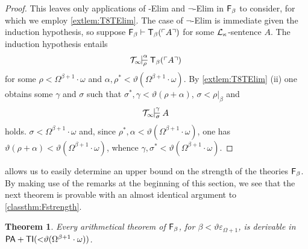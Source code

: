 \documentclass[UKenglish,cleveref,DIV=12]{scrartcl}
\newtheorem{theorem}{Theorem}
\theoremstyle{definition}
\theoremstyle{definition}
\begin{document}
\begin{proof}
This leaves only applications of \textT\beta-Elim and $\lnot$\textT\beta-Elim in
$\mathsf{F}_\beta$ to consider, for which we employ \cref{extlem:T8TElim}. The case of $\lnot$\textT\beta-Elim is immediate given the induction hypothesis, so suppose
$\mathsf{F}_\beta\vdash \mathsf{T}_\beta(\ulcorner{A}\urcorner)$
for some $\mathcal{L}_\kappa$-sentence $A$. The induction hypothesis entails
\begin{align}\label{exteqn:T8embed5}
  \Tinfty\prov\alpha\rho{\T_\beta(\gn A)}
\end{align}
for some $\rho<\Omega^{\beta+1}\cdot\omega$ and $\alpha,\rho^*<
\vartheta(\Omega^{\beta+1}\cdot\omega)$. By \cref{extlem:T8TElim} (ii) one
obtains some $\gamma$ and $\sigma$ such that $\sigma^*,\gamma<\vartheta(\rho+\alpha)$, $\sigma<\rho|_\beta$ and
\begin{align*}
  \Tinfty\prov\gamma\sigma{A}
\end{align*}
holds. $\sigma<\Omega^{\beta+1}\cdot\omega$ and, since
$\rho^*,\alpha<\vartheta(\Omega^{\beta+1}\cdot\omega)$, one has
$\vartheta(\rho+\alpha)<\vartheta(\Omega^{\beta+1}\cdot\omega)$, whence
$\gamma,\sigma^*<\vartheta(\Omega^{\beta+1}\cdot\omega)$.
\end{proof}
 allows us to easily determine an upper bound on the strength of the theories $\mathsf{F}_\beta$. By making use of the remarks at the beginning of this section, we see that the next theorem is provable with an almost identical argument to \cref{classthm:Fstrength}.
\begin{theorem}\label{extthm:FbetaupperbdI}
 Every arithmetical theorem of $\mathsf{F}_\beta$, for $\beta<\vartheta\varepsilon_{\Omega+1}$, is derivable in
$\mathsf{PA}+\mathsf{TI}(\mathord<\vartheta(\Omega^{\beta+1}\cdot\omega))$.
\end{theorem}
%
\end{document}
